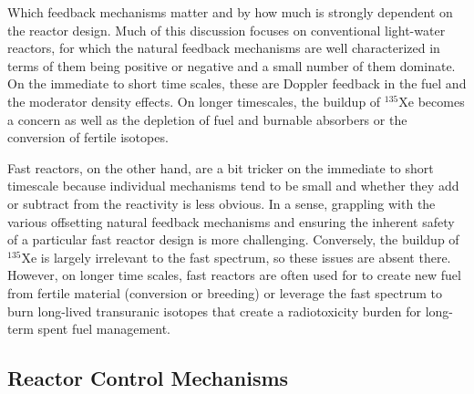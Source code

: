 Which feedback mechanisms matter and by how much is strongly dependent on the reactor design. Much of this discussion focuses on conventional light-water reactors, for which the natural feedback mechanisms are well characterized in terms of them being positive or negative and a small number of them dominate. On the immediate to short time scales, these are Doppler feedback in the fuel and the moderator density effects. On longer timescales, the buildup of $^{135}$Xe becomes a concern as well as the depletion of fuel and burnable absorbers or the conversion of fertile isotopes.

Fast reactors, on the other hand, are a bit tricker on the immediate to short timescale because individual mechanisms tend to be small and whether they add or subtract from the reactivity is less obvious. In a sense, grappling with the various offsetting natural feedback mechanisms and ensuring the inherent safety of a particular fast reactor design is more challenging. Conversely, the buildup of $^{135}$Xe is largely irrelevant to the fast spectrum, so these issues are absent there. However, on longer time scales, fast reactors are often used for to create new fuel from fertile material (conversion or breeding) or leverage the fast spectrum to burn long-lived transuranic isotopes that create a radiotoxicity burden for long-term spent fuel management.

\subsection{Reactor Control Mechanisms}


